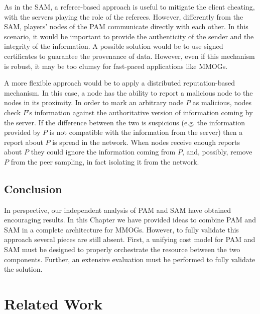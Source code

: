 \documentclass[final,10pt,a5paper]{phdimt}
\theoremstyle{definition}
\begin{document}
As in the SAM, a referee-based approach is useful to mitigate the client cheating, with the servers playing the role of the referees.
However, differently from the SAM, players' nodes of the PAM communicate directly with each other.
In this scenario, it would be important to provide the authenticity of the sender and the integrity of the information.
A possible solution would be to use signed certificates to guarantee the provenance of data.
However, even if this mechanism is robust, it may be too clumsy for fast-paced applications like MMOGs.


A more flexible approach would be to apply a distributed reputation-based mechanism.
In this case, a node has the ability to report a malicious node to the nodes in its proximity.
In order to mark an arbitrary node $P$ as malicious, nodes check $P$'s information against the authoritative version of information coming by the server. If the difference between the two is suspicious (e.g. the information provided by $P$ is not compatible with the information from the server) then a report about $P$ is spread in the network.
When nodes receive enough reports about $P$ they could ignore the information coming from $P$, and, possibly, remove $P$ from the peer sampling, in fact isolating it from the network.

\section{Conclusion}


In perspective, our independent analysis of PAM and SAM have obtained encouraging results.
In this Chapter we have provided ideas to combine PAM and SAM in a complete architecture for MMOGs.
However, to fully validate this approach several pieces are still absent.
First, a unifying cost model for PAM and SAM must be designed to properly orchestrate the resource between the two components. Further, an extensive evaluation must be performed to fully validate the solution.














\clearpage{}
\clearpage{}
\chapter{Related Work}
\label{chap:related}
\end{document}
